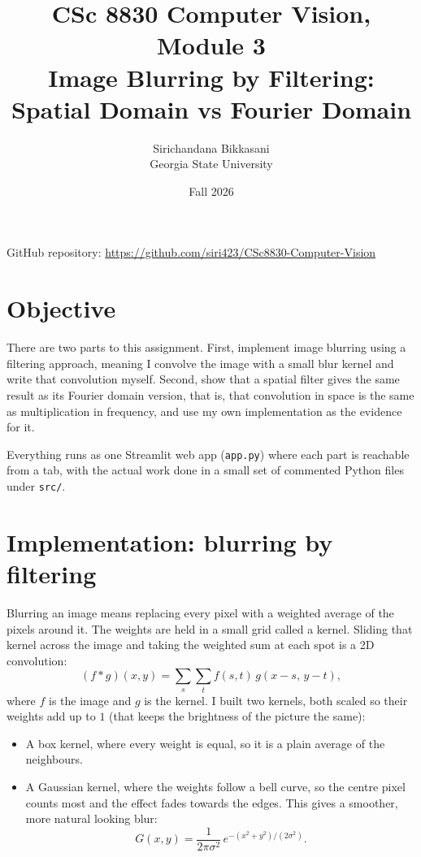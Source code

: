 \documentclass[11pt]{article}
\title{\vspace{-1.5em}CSc 8830 Computer Vision, Module 3\\[0.3em]
\large Image Blurring by Filtering: Spatial Domain vs Fourier Domain}
\author{Sirichandana Bikkasani \\ Georgia State University}
\date{Fall 2026}
\begin{document}
\maketitle

\noindent GitHub repository: \url{https://github.com/siri423/CSc8830-Computer-Vision}

\section{Objective}

There are two parts to this assignment. First, implement image blurring using a
filtering approach, meaning I convolve the image with a small blur kernel and
write that convolution myself. Second, show that a spatial filter gives the same
result as its Fourier domain version, that is, that convolution in space is the
same as multiplication in frequency, and use my own implementation as the
evidence for it.

Everything runs as one Streamlit web app (\texttt{app.py}) where each part is
reachable from a tab, with the actual work done in a small set of commented
Python files under \texttt{src/}.

\section{Implementation: blurring by filtering}

Blurring an image means replacing every pixel with a weighted average of the
pixels around it. The weights are held in a small grid called a kernel. Sliding
that kernel across the image and taking the weighted sum at each spot is a 2D
convolution:
\begin{equation}
(f * g)(x,y) = \sum_{s}\sum_{t} f(s,t)\, g(x-s,\, y-t),
\end{equation}
where $f$ is the image and $g$ is the kernel. I built two kernels, both scaled so
their weights add up to $1$ (that keeps the brightness of the picture the same):

\begin{itemize}
\item A box kernel, where every weight is equal, so it is a plain average of the
neighbours.
\item A Gaussian kernel, where the weights follow a bell curve, so the centre
pixel counts most and the effect fades towards the edges. This gives a smoother,
more natural looking blur:
\begin{equation}
G(x,y) = \frac{1}{2\pi\sigma^2}\, e^{-(x^2 + y^2)/(2\sigma^2)}.
\end{equation}
\end{itemize}
\end{document}
